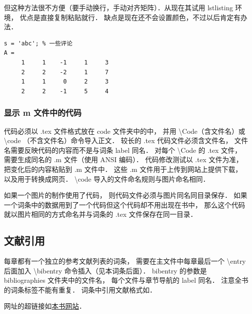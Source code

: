 但这种方法很不方便（要手动换行，手动对齐矩阵）．从现在其试用 lstlisting 环境， 优点是直接复制粘贴就行． 缺点是现在还不会设置颜色，不过以后肯定有办法．
\begin{lstlisting}[language=plain]
s = 'abc'; % 一些评论
A =
     1     1    -1     1     3
     2     2    -2     1     7
     1     1     0     2     3
     2     2    -1     5     4
\end{lstlisting}

\subsubsection{显示 m 文件中的代码}

代码必须以  .tex 文件格式放在 code 文件夹中的中， 并用 \textbackslash Code（含文件名）或  \textbackslash code （不含文件名）命令导入正文． 较长的 .tex 代码文件必须含文件名， 文件名需要反映代码的内容而不是与词条 label 同名． 对每个 \textbackslash Code 的 .tex 文件， 需要生成同名的 .m 文件（使用 ANSI 编码）． 代码修改测试以 .tex 文件为准， 把变化后的内容粘贴到 .m 文件中． 这些 .m 文件用于上传到网站上提供下载， 以及用于转换成网页． \textbackslash code 导入的文件命名规则与图片命名相同．

如果一个图片的制作使用了代码， 则代码文件必须与图片同名同目录保存． 如果一个词条中的数据用到了一个代码但这个代码却不用出现在书中， 那么这个代码就以图片相同的方式命名并与词条的 .tex 文件保存在同一目录． 


\subsection{文献引用}
每章都有一个独立的参考文献列表的词条， 需要在主文件中每章最后一个 \textbackslash entry 后面加入 \textbackslash bibentry 命令插入（见本词条后面）． bibentry 的参数是 bibliographies 文件夹中的文件名， 每个文件与章节导航的 label 同名． 注意全书的词条标签不能有重复． 词条中引用文献格式如\cite{PhysWiki}\cite{PhysWikiEng}．

网址的超链接如\href{http://littleshi.cn}{\color{blue}本书网站}．

